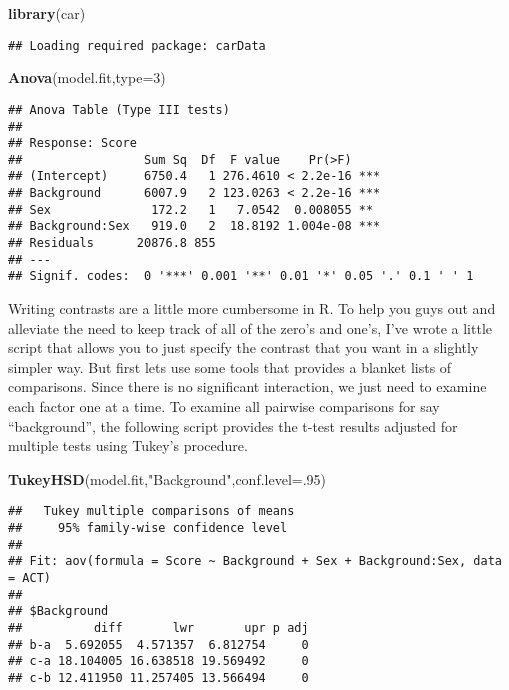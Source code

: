 \documentclass[]{article}
\newenvironment{Shaded}{\begin{snugshade}}{\end{snugshade}}
\newcommand{\DataTypeTok}[1]{\textcolor[rgb]{0.13,0.29,0.53}{#1}}
\newcommand{\DecValTok}[1]{\textcolor[rgb]{0.00,0.00,0.81}{#1}}
\newcommand{\KeywordTok}[1]{\textcolor[rgb]{0.13,0.29,0.53}{\textbf{#1}}}
\newcommand{\NormalTok}[1]{#1}
\newcommand{\StringTok}[1]{\textcolor[rgb]{0.31,0.60,0.02}{#1}}
\begin{document}
\begin{Shaded}
\begin{Highlighting}[]
\KeywordTok{library}\NormalTok{(car)}
\end{Highlighting}
\end{Shaded}

\begin{verbatim}
## Loading required package: carData
\end{verbatim}

\begin{Shaded}
\begin{Highlighting}[]
\KeywordTok{Anova}\NormalTok{(model.fit,}\DataTypeTok{type=}\DecValTok{3}\NormalTok{)}
\end{Highlighting}
\end{Shaded}

\begin{verbatim}
## Anova Table (Type III tests)
## 
## Response: Score
##                 Sum Sq  Df  F value    Pr(>F)    
## (Intercept)     6750.4   1 276.4610 < 2.2e-16 ***
## Background      6007.9   2 123.0263 < 2.2e-16 ***
## Sex              172.2   1   7.0542  0.008055 ** 
## Background:Sex   919.0   2  18.8192 1.004e-08 ***
## Residuals      20876.8 855                       
## ---
## Signif. codes:  0 '***' 0.001 '**' 0.01 '*' 0.05 '.' 0.1 ' ' 1
\end{verbatim}

Writing contrasts are a little more cumbersome in R. To help you guys
out and alleviate the need to keep track of all of the zero's and one's,
I've wrote a little script that allows you to just specify the contrast
that you want in a slightly simpler way. But first lets use some tools
that provides a blanket lists of comparisons. Since there is no
significant interaction, we just need to examine each factor one at a
time. To examine all pairwise comparisons for say ``background'', the
following script provides the t-test results adjusted for multiple tests
using Tukey's procedure.

\begin{Shaded}
\begin{Highlighting}[]
\KeywordTok{TukeyHSD}\NormalTok{(model.fit,}\StringTok{"Background"}\NormalTok{,}\DataTypeTok{conf.level=}\NormalTok{.}\DecValTok{95}\NormalTok{)}
\end{Highlighting}
\end{Shaded}

\begin{verbatim}
##   Tukey multiple comparisons of means
##     95% family-wise confidence level
## 
## Fit: aov(formula = Score ~ Background + Sex + Background:Sex, data = ACT)
## 
## $Background
##          diff       lwr       upr p adj
## b-a  5.692055  4.571357  6.812754     0
## c-a 18.104005 16.638518 19.569492     0
## c-b 12.411950 11.257405 13.566494     0
\end{verbatim}
\end{document}
